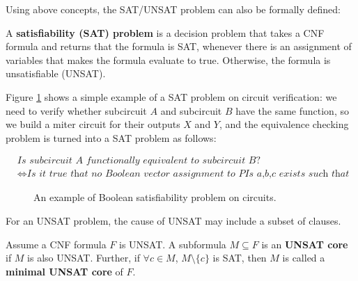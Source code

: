 Using above concepts, the SAT/UNSAT problem can also be formally defined:
\begin{Definition}
A {\bf satisfiability (SAT) problem} is a decision problem that takes a CNF formula and returns
that the formula is SAT, whenever there is an assignment of variables that makes the 
formula evaluate to true. Otherwise, the formula is unsatisfiable (UNSAT).
\end{Definition}

Figure \ref{fig:SAT} shows a simple example of a SAT problem on circuit verification:
we need to verify whether subcircuit $A$ and subcircuit $B$ have the same function, so
we build a miter circuit for their outputs $X$ and $Y$, and the equivalence checking 
problem is turned into a SAT problem as follows:

\vspace{-0.7in}
\begin{center}
\begin{align*}
&\textit{Is\ subcircuit\ A\ functionally\ equivalent\ to\ subcircuit\ B?}\\
&\Longleftrightarrow
\textit{Is\ it\ true\ that\ no\ Boolean\ vector\ assignment\ to\ PIs\ a,b,c\ exists\ such\ that\ Z=1?}
\end{align*}
\end{center}

\begin{figure}[bp]
\caption{An example of Boolean satisfiability problem on circuits.}
\label{fig:SAT}
\end{figure}

For an UNSAT problem, the cause of UNSAT may include a subset of clauses.
\begin{Definition}
Assume a CNF formula $F$ is UNSAT. A subformula $M \subseteq F$ is an {\bf UNSAT core} 
if $M$ is also UNSAT. Further, if $\forall c\in M$, $M\setminus\{c\}$ is SAT, then 
$M$ is called a {\bf minimal UNSAT core} of $F$.
\end{Definition}

